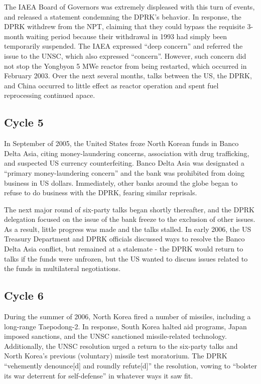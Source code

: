 \documentclass{article}
\begin{document}
The IAEA Board of Governors was extremely displeased with this turn of events, and released a statement condemning the DPRK’s behavior\cite{iaea03}. In response, the DPRK withdrew from the NPT, claiming that they could bypass the requisite 3-month waiting period because their withdrawal in 1993 had simply been temporarily suspended\cite{kcna4}. The IAEA expressed “deep concern” and referred the issue to the UNSC, which also expressed “concern”\cite{iaea09}. However, such concern did not stop the Yongbyon 5 MWe reactor from being restarted, which occurred in February 2003\cite{davenport}. Over the next several months, talks between the US, the DPRK, and China occurred to little effect as reactor operation and spent fuel reprocessing continued apace\cite{davenport}.

\subsection{Cycle 5}
In September of 2005, the United States froze North Korean funds in Banco Delta Asia, citing money-laundering concerns, association with drug trafficking, and suspected US currency counterfeiting\cite{davenport}. Banco Delta Asia was designated a “primary money-laundering concern” and the bank was prohibited from doing business in US dollars. Immediately, other banks around the globe began to refuse to do business with the DPRK, fearing similar reprisals\cite{greenlees}.

The next major round of six-party talks began shortly thereafter, and the DPRK delegation focused on the issue of the bank freeze to the exclusion of other issues\cite{greenlees}. As a result, little progress was made and the talks stalled. In early 2006, the US Treasury Department and DPRK officials discussed ways to resolve the Banco Delta Asia conflict, but remained at a stalemate - the DPRK would return to talks if the funds were unfrozen, but the US wanted to discuss issues related to the funds in multilateral negotiations\cite{greenlees}.

\subsection{Cycle 6}

During the summer of 2006, North Korea fired a number of missiles, including a long-range Taepodong-2. In response, South Korea halted aid programs, Japan imposed sanctions, and the UNSC sanctioned missile-related technology\cite{greenlees}. Additionally, the UNSC resolution urged a return to the six-party talks and North Korea’s previous (voluntary) missile test moratorium\cite{unsc06}. The DPRK “vehemently denounce[d] and roundly refute[d]” the resolution, vowing to “bolster its war deterrent for self-defense” in whatever ways it saw fit\cite{kcna5}.
\end{document}
